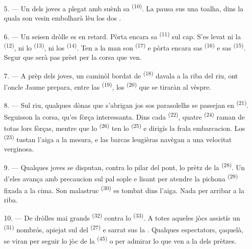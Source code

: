 5. --- Un dels joves a plegat amb suènh sa  \textsuperscript{(10)}.
La pausa sus una toalha, dins la quala son vesin embolharà lèu los dos
.

6. --- Un seisen dròlle es en retard. Pòrta encara sa 
\textsuperscript{(11)} sul cap. S'es levat ni la 
\textsuperscript{(12)}, ni lo  \textsuperscript{(13)}, ni los
 \textsuperscript{(14)}. Ten a la man son 
\textsuperscript{(17)} e pòrta encara sas  \textsuperscript{(16)} e
sas  \textsuperscript{(15)}. Segur que serà pas prèst per la
corsa que ven.

7. --- A prèp dels joves, un caminòl bordat de 
\textsuperscript{(18)} davala a la riba del riu, ont l'oncle Jaume prepara, entre
las  \textsuperscript{(19)}, los 
\textsuperscript{(20)} que se tiraràn al vèspre.

\VUsaut{4.4mm}
\VUsaut{3.4mm}

8. --- Sul riu, qualques dònas que s'abrigan jos sos parasolelhs se passejan en
 \textsuperscript{(21)}. Seguisson la corsa, qu'es fòrça
interessanta. Dins cada  \textsuperscript{(22)}, quatre
 \textsuperscript{(24)} raman de totas lors fòrças, mentre que lo
 \textsuperscript{(26)} ten lo 
\textsuperscript{(25)} e dirigís la frala embarcacion. Los 
\textsuperscript{(23)} tustan l'aiga a la mesura, e las barcas leugièras navègan
a una velocitat verginosa.

9. --- Qualques joves se disputan, contra lo pilar del pont, lo prètz de la
 \textsuperscript{(28)}. Un d'eles avança amb precaucion
sul pal sople e lisant per atendre la pichona 
\textsuperscript{(29)} fixada a la cima. Son malastruc 
\textsuperscript{(30)} es tombat dins l'aiga. Nada per arribar a la riba.

10. --- De dròlles mai grands  \textsuperscript{(32)}
contra lo  \textsuperscript{(33)}. A totes aqueles jòcs assistís un
 \textsuperscript{(31)} nombrós, apiejat sul  del
 \textsuperscript{(27)} e sarrat sus la . Qualques
espectators, çaquelà, se viran per seguir lo jòc de la 
\textsuperscript{(45)} o per admirar lo  que ven a la
 dels prètzes.

